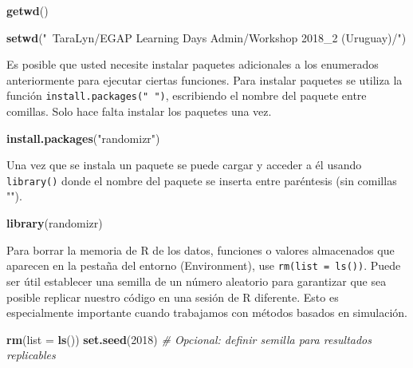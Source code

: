 \documentclass[12pt,spanish,]{book}
\newenvironment{Shaded}{\begin{snugshade}}{\end{snugshade}}
\newcommand{\CommentTok}[1]{\textcolor[rgb]{0.56,0.35,0.01}{\textit{#1}}}
\newcommand{\DataTypeTok}[1]{\textcolor[rgb]{0.13,0.29,0.53}{#1}}
\newcommand{\DecValTok}[1]{\textcolor[rgb]{0.00,0.00,0.81}{#1}}
\newcommand{\KeywordTok}[1]{\textcolor[rgb]{0.13,0.29,0.53}{\textbf{#1}}}
\newcommand{\NormalTok}[1]{#1}
\newcommand{\StringTok}[1]{\textcolor[rgb]{0.31,0.60,0.02}{#1}}
\begin{document}
\begin{Shaded}
\begin{Highlighting}[]
\KeywordTok{getwd}\NormalTok{()}
\end{Highlighting}
\end{Shaded}

\begin{Shaded}
\begin{Highlighting}[]
\KeywordTok{setwd}\NormalTok{(}\StringTok{"~TaraLyn/EGAP Learning Days Admin/Workshop 2018_2 (Uruguay)/"}\NormalTok{)   }
\end{Highlighting}
\end{Shaded}

Es posible que usted necesite instalar paquetes adicionales a los enumerados anteriormente para ejecutar ciertas funciones. Para instalar paquetes se utiliza la función \texttt{install.packages("\ ")}, escribiendo el nombre del paquete entre comillas. Solo hace falta instalar los paquetes una vez.

\begin{Shaded}
\begin{Highlighting}[]
\KeywordTok{install.packages}\NormalTok{(}\StringTok{"randomizr"}\NormalTok{)  }
\end{Highlighting}
\end{Shaded}

Una vez que se instala un paquete se puede cargar y acceder a él usando \texttt{library()} donde el nombre del paquete se inserta entre paréntesis (sin comillas "").

\begin{Shaded}
\begin{Highlighting}[]
\KeywordTok{library}\NormalTok{(randomizr)}
\end{Highlighting}
\end{Shaded}

Para borrar la memoria de R de los datos, funciones o valores almacenados que aparecen en la pestaña del entorno (Environment), use \texttt{rm(list\ =\ ls())}. Puede ser útil establecer una semilla de un número aleatorio para garantizar que sea posible replicar nuestro código en una sesión de R diferente. Esto es especialmente importante cuando trabajamos con métodos basados en simulación.

\begin{Shaded}
\begin{Highlighting}[]
\KeywordTok{rm}\NormalTok{(}\DataTypeTok{list =} \KeywordTok{ls}\NormalTok{())                                   }
\KeywordTok{set.seed}\NormalTok{(}\DecValTok{2018}\NormalTok{)  }\CommentTok{# Opcional: definir semilla para resultados replicables}
\end{Highlighting}
\end{Shaded}
\end{document}

